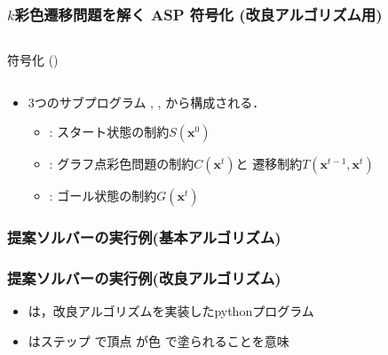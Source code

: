 \documentclass[dvipdfmx,11pt]{beamer}
\begin{document}
\begin{frame}[shrink]
  \frametitle{$k$彩色遷移問題を解く ASP 符号化 {\small(改良アルゴリズム用)}}

\begin{columns}[t]
\begin{column}{0.9\linewidth}
\begin{exampleblock}{ 符号化 ()}
 
\end{exampleblock}    
\end{column}
\end{columns}

\begin{itemize}
\item 3つのサブプログラム
  , , 
  から構成される．
  \begin{itemize}
  \item {} : スタート状態の制約$S(\bm{x}^0)$
  \item {} : グラフ点彩色問題の制約$C(\bm{x}^{t})$と
    遷移制約$T(\bm{x}^{t-1},\bm{x}^{t})$
  \item {} : ゴール状態の制約$G(\bm{x}^{t})$
  \end{itemize}
\end{itemize}
\end{frame}
\begin{frame}[shrink]
  \frametitle{提案ソルバーの実行例{\small (基本アルゴリズム)}}

\begin{exampleblock}{}
 
\end{exampleblock}    
  
\end{frame}
\begin{frame}%
  \frametitle{提案ソルバーの実行例{\small (改良アルゴリズム)}}

  \begin{exampleblock}{}
     
  \end{exampleblock}
  \begin{itemize}
  \item {}は，改良アルゴリズムを実装したpythonプログラム
  \item {}はステップ で頂点 が色
    で塗られることを意味
  \end{itemize}
\end{frame}
\end{document}
